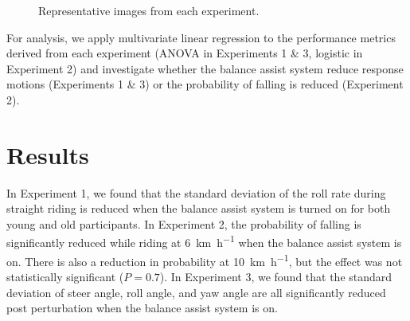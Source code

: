 \documentclass{icsc}
\def\kph{\kilo\meter\per\hour}
\begin{document}
\begin{figure}
  \begin{center}
    \caption{Representative images from each experiment.}
    \label{fig:experiments}
  \end{center}
\end{figure}

For analysis, we apply multivariate linear regression to the performance
metrics derived from each experiment (ANOVA in Experiments 1 \& 3, logistic in
Experiment 2) and investigate whether the balance assist system reduce response
motions (Experiments 1 \& 3) or the probability of falling is reduced
(Experiment 2).

\section{Results}
%
In Experiment 1, we found that the standard deviation of the roll rate during
straight riding is reduced when the balance assist system is turned on for both
young and old participants. In Experiment 2, the probability of falling is
significantly reduced while riding at 6~\si{\kph} when the balance assist
system is on. There is also a reduction in probability at 10~\si{\kph}, but
the effect was not statistically significant (\(P=0.7\)). In Experiment 3, we
found that the standard deviation of steer angle, roll angle, and yaw angle are
all significantly reduced post perturbation when the balance assist system is
on.
\end{document}
